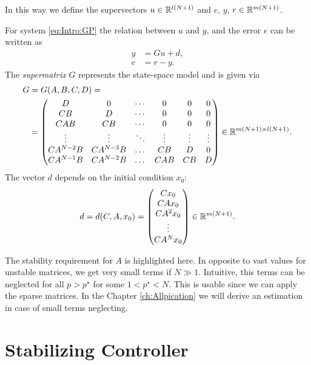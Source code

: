 In this way we define the supervectors $u \in {\mathbb{R}}^{l(N+1)} $ and $e$, $y$, $r \in {\mathbb{R}}^{m(N+1)}$.  

For system \eqref{eq:Intro:GP} the relation between $u$ and $y$, and the error $e$ can be written as
\begin{align}
\label{eq:Gu + d}
y &= Gu + d, \\
e &= r - y.
\end{align}
The \textit{supermatrix} $G$ represents the state-space model and is given via  
\begin{align}
\label{eq:Gmatrix}
\begin{split}
G &= G(A,B,C,D) = \\
&=  \begin{pmatrix}
D & 0 & \cdots & 0 & 0 & 0 \\
CB & D & \cdots & 0 & 0 & 0\\
CAB & CB & \cdots & 0 & 0 & 0\\
\vdots & \vdots & \ddots & \vdots  & \vdots & \vdots \\
CA^{N-2} B & CA^{N-3} B &\dots &CB & D& 0\\
CA^{N-1} B & CA^{N-2} B &\dots &CAB & CB& D\\
\end{pmatrix} \in {\mathbb{R}}^{m(N+1)\times l(N+1)}.
\end{split}
\end{align}
The vector $d$ depends on the initial condition $x_0$:
\begin{align}
d = d(C,A,x_0) = \begin{pmatrix}
C x_0 \\ CA x_0 \\ CA^2 x_0 \\ \vdots \\ CA^Nx_0
\end{pmatrix} \in {\mathbb{R}}^{m(N+1)}.
\end{align}

The stability requirement for $A$ is highlighted here. In opposite to vast values for unstable matrices, we get very small terms if $N \gg 1$. Intuitive, this terms can be neglected for all $p > p^\star$ for some $1<p^\star<N$. This is usable since we can apply the sparse matrices. In the Chapter \ref{ch:Allpication} we will derive an estimation in case of small terms neglecting. 


\section{Stabilizing Controller}
\label{ch:stabilizingController}

